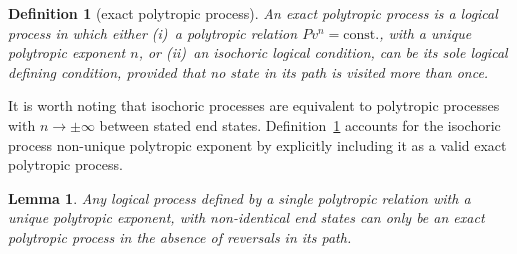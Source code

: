 \documentclass[fleqn,11pt]{SelfArx}
\newtheorem{definition}{Definition}
\newtheorem{lemma}{Lemma}
\begin{document}
    \begin{definition}[exact polytropic process]\label{def:exact.poly.proc}
        An exact polytropic process is a  logical  process  in  which  either  (i)~a  polytropic
        relation $Pv^n = \mbox{const.}$, with a  unique  polytropic  exponent  $n$,  or  (ii)~an
        isochoric logical condition, can be its sole logical defining condition,  provided  that
        no state in its path is visited more than once.
    \end{definition}

    It is worth noting that isochoric processes are equivalent to polytropic processes  with  $n
    \to \pm\infty$ between stated end states. Definition~\ref{def:exact.poly.proc} accounts  for
    the isochoric process non-unique polytropic exponent by explicitly including it as  a  valid
    exact polytropic process.

    \begin{lemma}\label{lemm:matching.def}
        Any logical process defined by a single polytropic relation  with  a  unique  polytropic
        exponent, with non-identical end states can only be an exact polytropic process  in  the
        absence of reversals in its path.
    \end{lemma}
\end{document}
